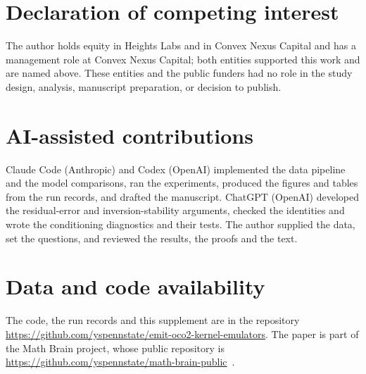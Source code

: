\documentclass[11pt]{article}
\newcommand{\1}{\mathbf{1}}
\numberwithin{equation}{section}
\begin{document}
\section*{Declaration of competing interest}

The author holds equity in Heights Labs and in Convex Nexus Capital and has a management role at
Convex Nexus Capital; both entities supported this work and are named above. These entities and
the public funders had no role in the study design, analysis, manuscript preparation, or
decision to publish.

\section*{AI-assisted contributions}

Claude Code (Anthropic) and Codex (OpenAI) implemented the data pipeline and the model
comparisons, ran the experiments, produced the figures and tables from the run records, and
drafted the manuscript. ChatGPT (OpenAI) developed the residual-error and inversion-stability
arguments, checked the identities and wrote the conditioning diagnostics and their tests. The
author supplied the data, set the questions, and reviewed the results, the proofs and the text.

\section*{Data and code availability}

The code, the run records and this supplement are in the repository
\url{https://github.com/yspennstate/emit-oco2-kernel-emulators}. The paper is part of the Math Brain project, whose public repository is \url{https://github.com/yspennstate/math-brain-public}~\cite{MathBrainRepo}.


\end{document}
